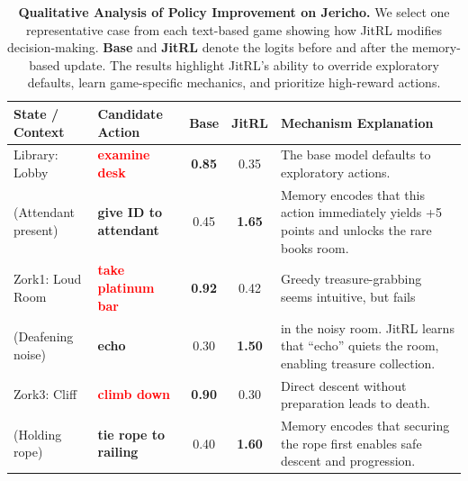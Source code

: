 \begin{table}[t]
    \centering
    \caption{\textbf{Qualitative Analysis of Policy Improvement on Jericho.} We select one representative case from each text-based game showing how JitRL modifies decision-making. \textbf{Base} and \textbf{JitRL} denote the logits before and after the memory-based update. The results highlight JitRL's ability to override exploratory defaults, learn game-specific mechanics, and prioritize high-reward actions.}
    \label{tab:jericho_case_study}
    \vspace{8pt}
    \small
    \renewcommand{\arraystretch}{0.9}

    \begin{tabularx}{\linewidth}{l l c c X}
        \toprule
        \textbf{State / Context} & \textbf{Candidate Action} & \textbf{Base} & \textbf{JitRL} & \textbf{Mechanism Explanation} \\
        \midrule

        Library: Lobby & \textcolor{red}{\textbf{examine desk}} & \textbf{0.85} & 0.35 & The base model defaults to exploratory actions. \\
        (Attendant present) & \textcolor{green!60!black}{\textbf{give ID to attendant}} & 0.45 & \textbf{1.65} & Memory encodes that this action immediately yields +5 points and unlocks the rare books room. \\

        \addlinespace[6pt]

        Zork1: Loud Room & \textcolor{red}{\textbf{take platinum bar}} & \textbf{0.92} & 0.42 & Greedy treasure-grabbing seems intuitive, but fails \\
        (Deafening noise) & \textcolor{green!60!black}{\textbf{echo}} & 0.30 & \textbf{1.50} & in the noisy room. JitRL learns that ``echo'' quiets the room, enabling treasure collection. \\

        \addlinespace[6pt]

        Zork3: Cliff & \textcolor{red}{\textbf{climb down}} & \textbf{0.90} & 0.30 & Direct descent without preparation leads to death. \\
        (Holding rope) & \textcolor{green!60!black}{\textbf{tie rope to railing}} & 0.40 & \textbf{1.60} & Memory encodes that securing the rope first enables safe descent and progression. \\

        \bottomrule

    \end{tabularx}
\end{table}
